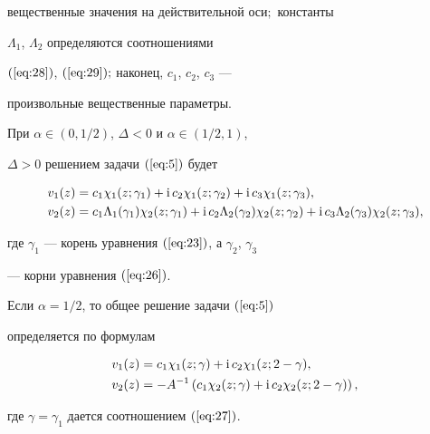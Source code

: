 \begin{thm}
вещественные значения на действительной оси$;$ константы


$\Lambda_1$, $\Lambda_2$ определяются соотношениями


$(\ref{eq:28})$, $(\ref{eq:29});$ наконец, $c_1$, $c_2$, $c_3$ ---


произвольные вещественные параметры.





При $\alpha\in (0,1/2)$, $\Delta<0$ и $\alpha\in (1/2,1)$,


$\Delta>0$ решением задачи $(\ref{eq:5})$ будет


\begin{equation}


\begin{split}


v_1(z)&=c_1\chi _1(z;\gamma_1)+\i c_2\chi _1(z;\gamma_2)+


\i c_3\chi _1(z;\gamma_3),\\


v_2(z)&=c_1\Lambda_1(\gamma_1)\chi _2(z;\gamma_1)+


\i c_2\Lambda_2(\gamma_2)\chi _2(z;\gamma_2)+


\i c_3\Lambda_2(\gamma_3)\chi _2(z;\gamma_3),


\end{split}\label{eq:32}


\end{equation}


где $\gamma_1$ --- корень уравнения $(\ref{eq:23})$, а $\gamma_2$, $\gamma_3$


--- корни уравнения $(\ref{eq:26})$.





Если $\alpha=1/2$, то общее решение задачи $(\ref{eq:5})$


определяется по формулам


\begin{equation}


\begin{split}


v_1(z)&=c_1\chi _1(z;\gamma)+\i c_2\chi _1(z;2-\gamma),\\


v_2(z)&=-A^{-1}\left(c_1\chi _2(z;\gamma)+


\i c_2\chi _2(z;2-\gamma)\right),\end{split}\label{eq:33}


\end{equation}


где $\gamma=\gamma_1$ дается соотношением $(\ref{eq:27})$.


\end{thm}





